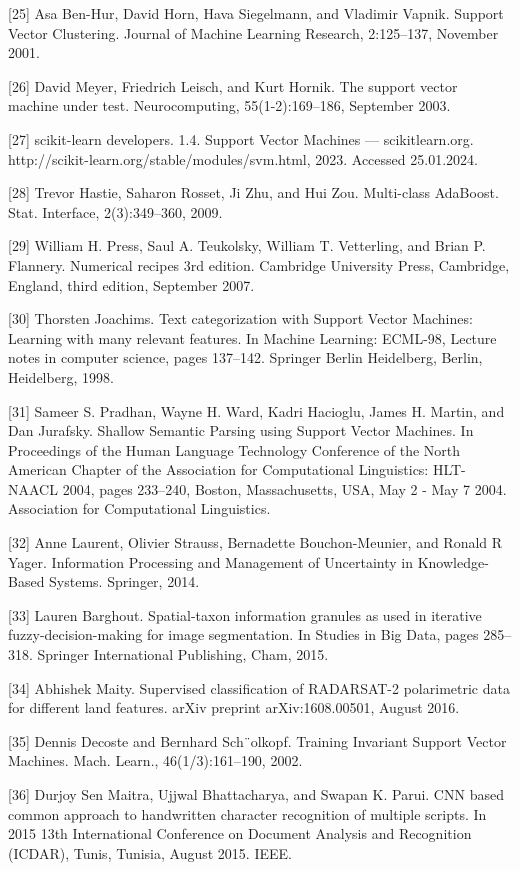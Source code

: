 \documentclass[preprint,12pt]{elsarticle}
\begin{document}
[25] Asa Ben-Hur, David Horn, Hava Siegelmann, and Vladimir Vapnik. Support Vector Clustering. Journal of Machine Learning Research, 2:125–137, November 2001. 

[26] David Meyer, Friedrich Leisch, and Kurt Hornik. The support vector machine under test. Neurocomputing, 55(1-2):169–186, September 2003. 

[27] scikit-learn developers. 1.4. Support Vector Machines — scikitlearn.org. http://scikit-learn.org/stable/modules/svm.html, 2023. Accessed 25.01.2024. 

[28] Trevor Hastie, Saharon Rosset, Ji Zhu, and Hui Zou. Multi-class AdaBoost. Stat. Interface, 2(3):349–360, 2009. 

[29] William H. Press, Saul A. Teukolsky, William T. Vetterling, and Brian P. Flannery. Numerical recipes 3rd edition. Cambridge University Press, Cambridge, England, third edition, September 2007. 

[30] Thorsten Joachims. Text categorization with Support Vector Machines: Learning with many relevant features. In Machine Learning: ECML-98, Lecture notes in computer science, pages 137–142. Springer Berlin Heidelberg, Berlin, Heidelberg, 1998. 

[31] Sameer S. Pradhan, Wayne H. Ward, Kadri Hacioglu, James H. Martin, and Dan Jurafsky. Shallow Semantic Parsing using Support Vector Machines. In Proceedings of the Human Language Technology Conference of the North American Chapter of the Association for Computational Linguistics: HLT-NAACL 2004, pages 233–240, Boston, Massachusetts, USA, May 2 - May 7 2004. Association for Computational Linguistics. 

[32] Anne Laurent, Olivier Strauss, Bernadette Bouchon-Meunier, and Ronald R Yager. Information Processing and Management of Uncertainty in Knowledge-Based Systems. Springer, 2014. 

[33] Lauren Barghout. Spatial-taxon information granules as used in iterative fuzzy-decision-making for image segmentation. In Studies in Big Data, pages 285–318. Springer International Publishing, Cham, 2015. 

[34] Abhishek Maity. Supervised classification of RADARSAT-2 polarimetric data for different land features. arXiv preprint arXiv:1608.00501, August 2016. 

[35] Dennis Decoste and Bernhard Sch¨olkopf. Training Invariant Support Vector Machines. Mach. Learn., 46(1/3):161–190, 2002. 

[36] Durjoy Sen Maitra, Ujjwal Bhattacharya, and Swapan K. Parui. CNN based common approach to handwritten character recognition of multiple scripts. In 2015 13th International Conference on Document Analysis and Recognition (ICDAR), Tunis, Tunisia, August 2015. IEEE. 
\end{document}
